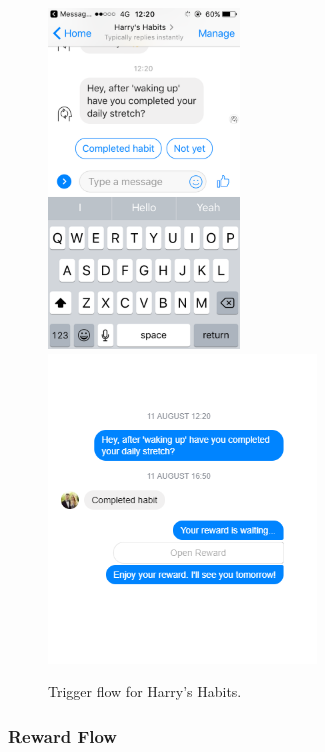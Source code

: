 \begin{figure}[H]
  \centering
  \includegraphics[width=2in]{resources/design/media/3.png}
  \hspace{10px}
  \includegraphics[width=2.8in]{resources/design/completed_habit.png}
  \caption{Trigger flow for Harry's Habits.}
  \label{fig:trigger_flow_screenshots}
\end{figure}


\subsubsection{Reward Flow} \label{reward_flow}

